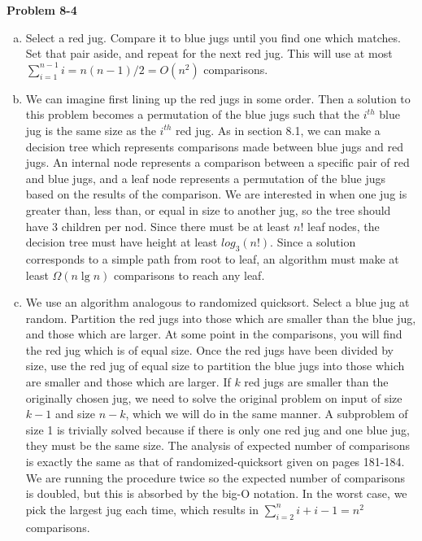 \documentclass{article}
\begin{document}
\noindent\textbf{Problem 8-4}\\
\begin{enumerate}[a.]
\item Select a red jug.  Compare it to blue jugs until you find one which matches.  Set that pair aside, and repeat for the next red jug.  This will use at most $\sum_{i=1}^{n-1} i = n(n-1)/2 = O(n^2)$ comparisons. \\

\item We can imagine first lining up the red jugs in some order.  Then a solution to this problem becomes a permutation of the blue jugs such that the $i^{th}$ blue jug is the same size as the $i^{th}$ red jug. As in section 8.1, we can make a decision tree which represents comparisons made between blue jugs and red jugs.  An internal node represents a comparison between a specific pair of red and blue jugs, and a leaf node represents a permutation of the blue jugs based on the results of the comparison. We are interested in when one jug is greater than, less than, or equal in size to another jug, so the tree should have 3 children per nod.  Since there must be at least $n!$ leaf nodes, the decision tree must have height at least $log_3(n!)$.  Since a solution corresponds to a simple path from root to leaf, an algorithm must make at least $\Omega(n \lg n)$ comparisons to reach any leaf. \\

\item We use an algorithm analogous to randomized quicksort. Select a blue jug at random. Partition the red jugs into those which are smaller than the blue jug, and those which are larger. At some point in the comparisons, you will find the red jug which is of equal size.  Once the red jugs have been divided by size, use the red jug of equal size to partition the blue jugs into those which are smaller and those which are larger.  If $k$ red jugs are smaller than the originally chosen jug, we need to solve the original problem on input of size $k-1$ and size $n-k$, which we will do in the same manner. A subproblem of size 1 is trivially solved because if there is only one red jug and one blue jug, they must be the same size. The analysis of expected number of comparisons is exactly the same as that of randomized-quicksort given on pages 181-184.  We are running the procedure twice so the expected number of comparisons is doubled, but this is absorbed by the big-O notation. In the worst case, we pick the largest jug each time, which results in $\sum_{i=2}^{n} i + i - 1 =n^2$ comparisons. 
\end{enumerate}
\end{document}
